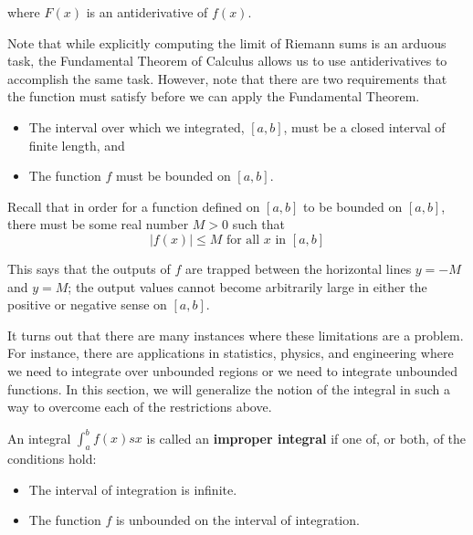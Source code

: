 \documentclass{ximera}
\begin{document}
where $F(x)$ is an antiderivative of $f(x)$.

Note that while explicitly computing the limit of Riemann sums is an arduous task, the Fundamental Theorem of Calculus allows us to use antiderivatives to accomplish the same task.  However, note that there are two requirements that the function must satisfy before we can apply the Fundamental Theorem.

\begin{itemize}
\item The interval over which we integrated, $[a,b]$, must be a closed interval of finite length, and
\item The function $f$ must be bounded on $[a,b]$.
\end{itemize}


\begin{remark}
Recall that in order for a function defined on $[a, b]$ to be bounded on $[a,b]$, there must be some real number $M>0$ such that 
\[
|f(x)| \leq M \text{ for all } x \text{ in } [a, b]
\]

This says that the outputs of $f$ are trapped between the horizontal lines $y=-M$ and $y=M$; the output values cannot 
become arbitrarily large in either the positive or negative sense on $[a,b]$. 
\end{remark}


It turns out that there are many instances where these limitations are a problem.  For instance, there are applications in statistics, physics, and engineering where we need to integrate over unbounded regions or we need to integrate unbounded functions.  In this section, we will generalize the notion of the integral in such a way to overcome each of the restrictions above.



\begin{definition}
  An integral $\int_a^b f(x) sx $
  is called an \textbf{improper integral} if one of, or both, of the conditions hold:
  \begin{itemize}
  \item The interval of integration is infinite.
  \item The function $f$ is unbounded on the interval of integration.
  \end{itemize}
\end{definition}
\end{document}
